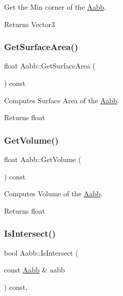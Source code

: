 Get the Min corner of the \hyperlink{classAabb}{Aabb}. 

\begin{DoxyReturn}{Returns}
Vector3 
\end{DoxyReturn}
\mbox{\label{classAabb_aa5c6fea4dcb0a7f9640a72b1babfe192}} 
\subsubsection{\texorpdfstring{Get\+Surface\+Area()}{GetSurfaceArea()}}
{\footnotesize\ttfamily float Aabb\+::\+Get\+Surface\+Area (\begin{DoxyParamCaption}{ }\end{DoxyParamCaption}) const}



Computes Surface Area of the \hyperlink{classAabb}{Aabb}. 

\begin{DoxyReturn}{Returns}
float 
\end{DoxyReturn}
\mbox{\label{classAabb_ad0f21e16f7be2c42839b0cb025eeed9f}} 
\subsubsection{\texorpdfstring{Get\+Volume()}{GetVolume()}}
{\footnotesize\ttfamily float Aabb\+::\+Get\+Volume (\begin{DoxyParamCaption}{ }\end{DoxyParamCaption}) const}



Computes Volume of the \hyperlink{classAabb}{Aabb}. 

\begin{DoxyReturn}{Returns}
float 
\end{DoxyReturn}
\mbox{\label{classAabb_a98746a9bae7409bd1cf3734125b62da6}} 
\subsubsection{\texorpdfstring{Is\+Intersect()}{IsIntersect()}\hspace{0.1cm}{\footnotesize\ttfamily [1/2]}}
{\footnotesize\ttfamily bool Aabb\+::\+Is\+Intersect (\begin{DoxyParamCaption}\item[{const \hyperlink{classAabb}{Aabb} \&}]{aabb }\end{DoxyParamCaption}) const\hspace{0.3cm}{\ttfamily [override]}, {\ttfamily [virtual]}}



